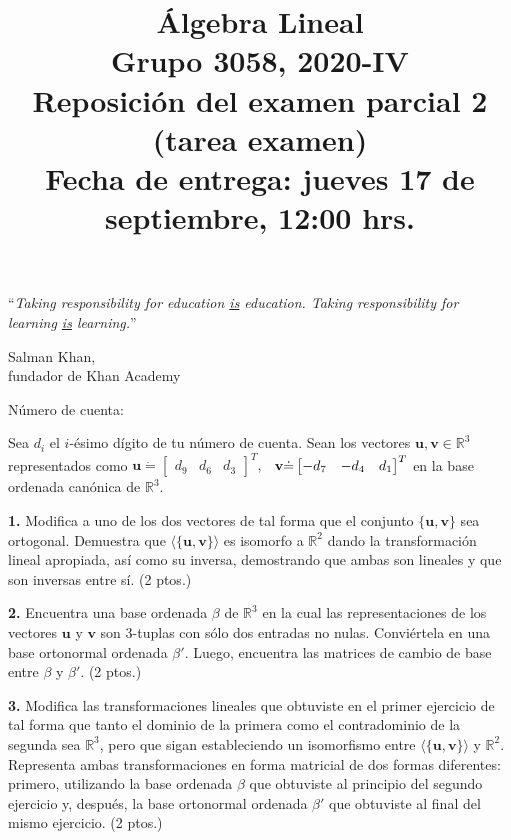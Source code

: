 \documentclass[a4paper]{article}
\begin{document}
\title{Álgebra Lineal \\ Grupo 3058, 2020-IV \\ Reposición del examen parcial 2 (tarea examen) \\ Fecha de entrega: jueves 17 de septiembre, 12:00 hrs.}
\date{}
\maketitle


\epigraph{``\textit{Taking responsibility for education \underline{is} education. Taking responsibility for learning \underline{is} learning.}''}{\textemdash Salman Khan, \\ fundador de Khan Academy}

Número de cuenta:

\vspace{5mm}

\noindent Sea $d_i$ el $i$-ésimo dígito de tu número de cuenta. Sean los vectores $\mathbf{u},\mathbf{v}\in\mathbb{R}^3$ representados como $\mathbf{u}\dot{=}\begin{bmatrix} d_9 & d_6 & d_3 \end{bmatrix}^T,$ $\hspace{1.5mm} \mathbf{v}\dot{=}\begin{bmatrix} -d_7 & -d_4 & d_1 \end{bmatrix}^T$ en la base ordenada canónica de $\mathbb{R}^3$. 

\vspace{5mm}
\textbf{1.} Modifica a uno de los dos vectores de tal forma que el conjunto $\{\mathbf{u},\mathbf{v}\}$ sea ortogonal. Demuestra que $\langle \{\mathbf{u},\mathbf{v}\}  \rangle$ es isomorfo a $\mathbb{R}^2$ dando la transformación lineal apropiada, así como su inversa, demostrando que ambas son lineales y que son inversas entre sí. (2 ptos.)

\vspace{5mm}
\textbf{2.} Encuentra una base ordenada $\beta$ de $\mathbb{R}^3$ en la cual las representaciones de los vectores $\mathbf{u}$ y $\mathbf{v}$ son $3$-tuplas con sólo dos entradas no nulas. Conviértela en una base ortonormal ordenada $\beta'$. Luego, encuentra las matrices de cambio de base entre $\beta$ y $\beta'$. (2 ptos.)

\vspace{5mm}
\textbf{3.} Modifica las transformaciones lineales que obtuviste en el primer ejercicio de tal forma que tanto el dominio de la primera como el contradominio de la segunda sea $\mathbb{R}^3$, pero que sigan estableciendo un isomorfismo entre $\langle \{\mathbf{u},\mathbf{v}\}  \rangle$ y $\mathbb{R}^2$. Representa ambas transformaciones en forma matricial de dos formas diferentes: primero, utilizando la base ordenada $\beta$ que obtuviste al principio del segundo ejercicio y, después, la base ortonormal ordenada $\beta'$ que obtuviste al final del mismo ejercicio. (2 ptos.)
\end{document}
